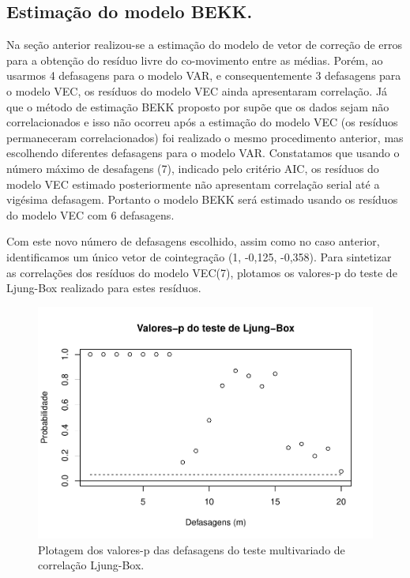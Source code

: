 

\subsection{Estimação do modelo BEKK.}\label{estimacao-do-modelo-bekk.}

Na seção anterior realizou-se a estimação do modelo de vetor de correção
de erros para a obtenção do resíduo livre do co-movimento entre as
médias. Porém, ao usarmos 4 defasagens para o modelo VAR, e
consequentemente 3 defasagens para o modelo VEC, os resíduos do modelo
VEC ainda apresentaram correlação. Já que o método de estimação BEKK
proposto por  supõe que os dados sejam não
correlacionados e isso não ocorreu após a estimação do modelo VEC (os
resíduos permaneceram correlacionados) foi realizado o mesmo
procedimento anterior, mas escolhendo diferentes defasagens para o
modelo VAR. Constatamos que usando o número máximo de desafagens (7),
indicado pelo critério AIC, os resíduos do modelo VEC estimado
posteriormente não apresentam correlação serial até a vigésima
defasagem. Portanto o modelo BEKK será estimado usando os resíduos do
modelo VEC com 6 defasagens.

Com este novo número de defasagens escolhido, assim como no caso
anterior, identificamos um único vetor de cointegração (1, -0,125,
-0,358). Para sintetizar as correlações dos resíduos do modelo VEC(7),
plotamos os valores-p do teste de Ljung-Box realizado para estes
resíduos.

\begin{figure}[htbp]
\centering
\includegraphics{mq2 test-1.pdf}
\caption{Plotagem dos valores-p das defasagens do teste multivariado de
correlação Ljung-Box.}
\end{figure}


